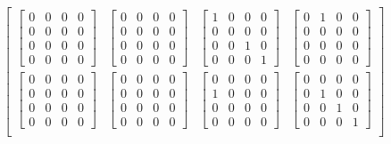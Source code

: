 \documentclass[twocolumn,10pt]{asme2ej}
\begin{document}
\begin{equation}
\begin{bmatrix}
        \begin{bmatrix} 0 & 0 & 0 & 0 \\ 0 & 0 & 0 & 0 \\ 0 & 0 & 0 & 0 \\ 0 & 0 & 0 & 0 \end{bmatrix} &
        \begin{bmatrix} 0 & 0 & 0 & 0 \\ 0 & 0 & 0 & 0 \\ 0 & 0 & 0 & 0 \\ 0 & 0 & 0 & 0 \end{bmatrix} &
        \begin{bmatrix} 1 & 0 & 0 & 0 \\ 0 & 0 & 0 & 0 \\ 0 & 0 & 1 & 0 \\ 0 & 0 & 0 & 1 \end{bmatrix} &
        \begin{bmatrix} 0 & 1 & 0 & 0 \\ 0 & 0 & 0 & 0 \\ 0 & 0 & 0 & 0 \\ 0 & 0 & 0 & 0 \end{bmatrix} \\
          \begin{bmatrix} 0 & 0 & 0 & 0 \\ 0 & 0 & 0 & 0 \\ 0 & 0 & 0 & 0 \\ 0 & 0 & 0 & 0 \end{bmatrix} &
          \begin{bmatrix} 0 & 0 & 0 & 0 \\ 0 & 0 & 0 & 0 \\ 0 & 0 & 0 & 0 \\ 0 & 0 & 0 & 0 \end{bmatrix} &
          \begin{bmatrix} 0 & 0 & 0 & 0 \\ 1 & 0 & 0 & 0 \\ 0 & 0 & 0 & 0 \\ 0 & 0 & 0 & 0 \end{bmatrix} &
          \begin{bmatrix} 0 & 0 & 0 & 0 \\ 0 & 1 & 0 & 0 \\ 0 & 0 & 1 & 0 \\ 0 & 0 & 0 & 1 \end{bmatrix} \\ \end{bmatrix}
\label{eq_cubmu}
\end{equation}
\end{document}
